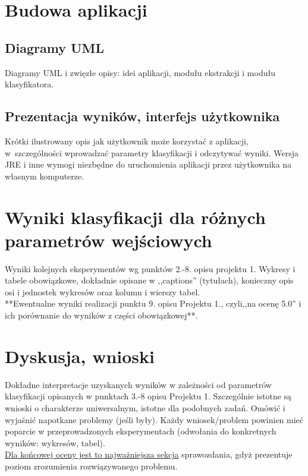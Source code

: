 \documentclass{classrep}
\begin{document}
\section{Budowa aplikacji}
\subsection{Diagramy UML}
Diagramy UML i zwięzłe opisy: idei aplikacji, modułu ekstrakcji i modułu
klasyfikatora.\\

\subsection{Prezentacja wyników, interfejs użytkownika} 
Krótki ilustrowany opis jak użytkownik może korzystać z aplikacji, w~szczególności wprowadzać parametry klasyfikacji i odczytywać wyniki. Wersja JRE i inne wymogi
niezbędne do uruchomienia aplikacji przez użytkownika na własnym komputerze. \\

\section{Wyniki klasyfikacji dla różnych parametrów wejściowych}
Wyniki kolejnych eksperymentów wg punktów 2.-8. opisu projektu 1.  Wykresy i tabele
obowiązkowe, dokładnie opisane w ,,captions'' (tytułach), konieczny opis osi i
jednostek wykresów oraz kolumn i wierszy tabel.\\ 

{**Ewentualne wyniki realizacji punktu 9. opisu Projektu 1., czyli,,na ocenę 5.0'' i ich porównanie do wyników z
części obowiązkowej**.}\\



\section{Dyskusja, wnioski}
Dokładne interpretacje uzyskanych wyników w zależności od parametrów klasyfikacji
opisanych w punktach 3.-8 opisu Projektu 1. 
Szczególnie istotne są wnioski o charakterze uniwersalnym, istotne dla podobnych zadań. 
Omówić i wyjaśnić napotkane problemy (jeśli były). Każdy wniosek/problem powinien mieć poparcie
w przeprowadzonych eksperymentach (odwołania do konkretnych wyników: wykresów,
tabel). \\
\underline{Dla końcowej oceny jest to najważniejsza sekcja} sprawozdania, gdyż prezentuje poziom
zrozumienia rozwiązywanego problemu.\\
\end{document}
